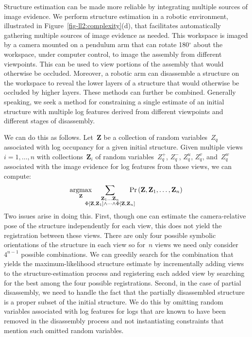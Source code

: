 Structure estimation can be made more reliable by integrating multiple sources
of image evidence.
%
We perform structure estimation in a robotic environment, illustrated in
Figure~\ref{fig-ll2:complexity}(d), that facilitates automatically gathering
multiple sources of image evidence as needed.
%
This workspace is imaged by a camera mounted on a pendulum arm that can rotate
180$^{\circ}$ about the workspace, under computer control, to image the
assembly from different viewpoints.
%
This can be used to view portions of the assembly that would otherwise be
occluded.
%
Moreover, a robotic arm can disassemble a structure on the workspace to reveal
the lower layers of a structure that would otherwise be occluded by higher
layers.
%
These methods can further be combined.
%
Generally speaking, we seek a method for constraining a single estimate
of an initial structure with multiple log features derived from different
viewpoints and different stages of disassembly.

We can do this as follows.
%
Let~$\mathbf{Z}$ be a collection of random variables~$Z_q$ associated with log
occupancy for a given initial structure.
%
Given multiple views $i=1,\ldots,n$ with collections~$\mathbf{Z}_i$ of random
variables~$Z^+_q$, $Z^-_q$, $Z^u_q$, $Z^v_q$, and~$Z^w_q$ associated with the
image evidence for log features from those views, we can compute:
%
\begin{equation*}
  \argmax_{\mathbf{Z}}\hspace{-12pt}
  \sum_{\substack{\mathbf{Z}_1\ldots\mathbf{Z}_n\\
      \Phi\left[\mathbf{Z},\mathbf{Z}_1\right]\wedge\cdots\wedge\Phi\left[\mathbf{Z},\mathbf{Z}_n\right]}}
  \hspace{-10pt}\Pr\left(\mathbf{Z},\mathbf{Z}_1,\ldots,\mathbf{Z}_n\right)
\end{equation*}
%
Two issues arise in doing this.
%
First, though one can estimate the camera-relative pose of the structure
independently for each view, this does not yield the registration between these
views.
%
There are only four possible symbolic orientations of the structure in each
view so for~$n$ views we need only consider~$4^{n-1}$ possible combinations.
%
We can greedily search for the combination that yields the maximum-likelihood
structure estimate by incrementally adding views to the structure-estimation
process and registering each added view by searching for the best among the
four possible registrations.
%
Second, in the case of partial disassembly, we need to handle the fact that the
partially disassembled structure is a proper subset of the initial structure.
%
We do this by omitting random variables associated with log features
for logs that are known to have been removed in the disassembly process and not
instantiating constraints that mention such omitted random variables.

